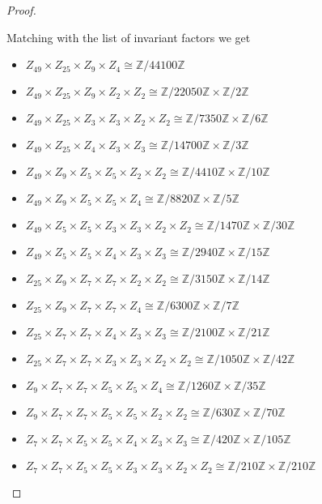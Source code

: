 \documentclass[10pt]{article}
\newcommand{\Z}{\mathbb{Z}}
\begin{document}
\begin{itemize}
\begin{proof}
\begin{item}
Matching with the list of invariant factors we get
\begin{itemize}
	\item $Z_{49} \times Z_{25} \times Z_9 \times Z_4 \cong \Z / 44100\Z$
	\item $Z_{49} \times Z_{25} \times Z_9 \times Z_2 \times Z_2 \cong \Z / 22050\Z \times \Z / 2\Z$
	\item $Z_{49} \times Z_{25} \times Z_3 \times Z_3 \times Z_2 \times Z_2\cong \Z / 7350\Z \times \Z / 6\Z$
	\item $Z_{49} \times Z_{25} \times Z_4 \times Z_3 \times Z_3\cong \Z / 14700\Z \times \Z / 3\Z$
	\item $Z_{49} \times Z_{9} \times Z_5 \times Z_5 \times Z_2 \times Z_2 \cong \Z / 4410\Z \times \Z / 10\Z$
	\item $Z_{49} \times Z_{9} \times Z_5 \times Z_5 \times Z_4 \cong \Z / 8820\Z \times \Z / 5\Z$
	\item $Z_{49} \times Z_{5} \times Z_5 \times Z_3 \times Z_3 \times Z_2 \times Z_2 \cong \Z / 1470\Z \times \Z / 30\Z$	
	\item $Z_{49} \times Z_{5} \times Z_5 \times Z_4 \times Z_3 \times Z_3 \cong \Z / 2940\Z \times \Z / 15\Z$	
	\item $Z_{25} \times Z_{9} \times Z_7 \times Z_7 \times Z_2 \times Z_2 \cong \Z / 3150\Z \times \Z / 14\Z$
	\item $Z_{25} \times Z_{9} \times Z_7 \times Z_7 \times Z_4 \cong \Z / 6300\Z \times \Z / 7\Z$
	\item $Z_{25} \times Z_{7} \times Z_7 \times Z_4 \times Z_3 \times Z_3 \cong \Z / 2100\Z \times \Z / 21\Z$
	\item $Z_{25} \times Z_{7} \times Z_7 \times Z_3 \times Z_3 \times Z_2 \times Z_2 \cong \Z / 1050\Z \times \Z / 42\Z$
	\item $Z_{9} \times Z_7 \times Z_7 \times Z_5 \times Z_5 \times Z_4 \cong \Z / 1260\Z \times \Z / 35\Z$
	\item $Z_{9} \times Z_7 \times Z_7 \times Z_5 \times Z_5 \times Z_2 \times Z_2 \cong \Z / 630\Z \times \Z / 70\Z$
	\item $Z_{7} \times Z_7 \times Z_5 \times Z_5 \times Z_4 \times Z_3 \times Z_3 \cong \Z / 420\Z \times \Z / 105\Z$
	\item $Z_{7} \times Z_7 \times Z_5 \times Z_5 \times Z_3 \times Z_3 \times Z_2 \times Z_2 \cong \Z / 210\Z \times \Z / 210\Z$
\end{itemize}

\end{item}


\end{proof}
\end{itemize}
\end{document}
